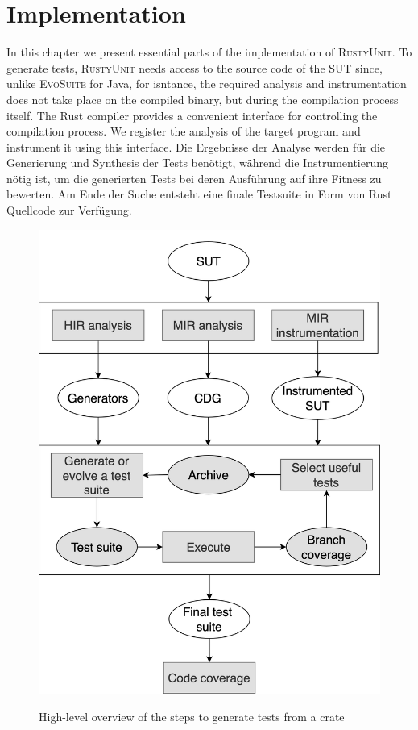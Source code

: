 \documentclass[paper=a4,%
  twoside,%
  BCOR4mm,%
  abstract=true,%
  toc=bibliography,%
  chapterprefix=true,%
  toc=bibliographynumbered,%
  open=right,%
  english,%
  pagesize=pdftex]{scrreprt}
\begin{document}
\clearpage
\chapter{Implementation}
\label{chap:implementation}
In this chapter we present essential parts of the implementation of \textsc{RustyUnit}. To generate tests, \textsc{RustyUnit} needs access to the source code of the \ac{SUT} since, unlike \textsc{EvoSuite} for Java, for isntance, the required analysis and instrumentation does not take place on the compiled binary, but during the compilation process itself. The Rust compiler provides a convenient interface for controlling the compilation process. We register the analysis of the target program and instrument it using this interface. Die Ergebnisse der Analyse werden für die Generierung und Synthesis der Tests benötigt, während die Instrumentierung nötig ist, um die generierten Tests bei deren Ausführung auf ihre Fitness zu bewerten. Am Ende der Suche entsteht eine finale Testsuite in Form von Rust Quellcode zur Verfügung.

\begin{figure}[h!]
\caption{High-level overview of the steps to generate tests from a crate}
\centering
\includegraphics[width=\textwidth]{new-overview}
\label{fig:rustyunit-overview}
\end{figure}
\end{document}
